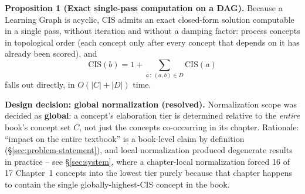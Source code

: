 \textbf{Proposition 1 (Exact single-pass computation on a DAG).}
Because a Learning Graph is acyclic, CIS admits an exact closed-form solution
computable in a single pass, without iteration and without a damping factor:
process concepts in topological order (each concept only after every concept
that depends on it has already been scored), and
\[
\mathrm{CIS}(b) = 1 + \sum_{a\,:\,(a,b)\in D} \mathrm{CIS}(a)
\]
falls out directly, in $O(|C|+|D|)$ time.


\textbf{Design decision: global normalization (resolved).}
Normalization scope was decided as \textbf{global}: a concept's elaboration
tier is determined relative to the \emph{entire} book's concept set $C$, not
just the concepts co-occurring in its chapter. Rationale: ``impact on the
entire textbook'' is a book-level claim by definition
(\S\ref{sec:problem-statement}), and local normalization produced degenerate
results in practice -- see \S\ref{sec:system}, where a chapter-local
normalization forced 16 of 17 Chapter~1 concepts into the lowest tier purely
because that chapter happens to contain the single globally-highest-CIS
concept in the book.


